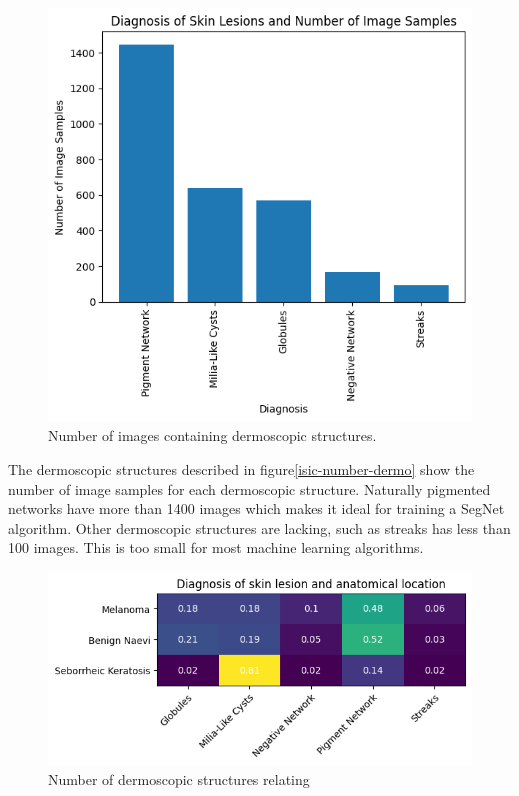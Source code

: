 \begin{figure}
	\centering
	\includegraphics[scale=0.75]{images/ISIC/isic-dermo-number.png}
	\caption{Number of images containing dermoscopic structures.}
\end{figure}\label{isic-number-dermo}

The dermoscopic structures described in figure\ref{isic-number-dermo} show the number of image samples for each dermoscopic structure. Naturally pigmented networks have more than 1400 images which makes it ideal for training a SegNet algorithm. Other dermoscopic structures are lacking, such as streaks has less than 100 images. This is too small for most machine learning algorithms.

\begin{figure}
	\centering
	\includegraphics[scale=0.75]{images/ISIC/isic-dermo-diagnosis-heat.png}
	\caption{Number of dermoscopic structures relating}
\end{figure}\label{isic-dermo-diagnosis}

